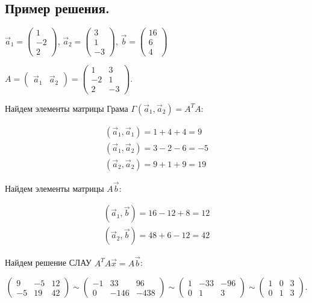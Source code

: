 \subsection{
    Пример решения.
}

$\vec{a}_1 = \begin{pmatrix} 1 \\ -2 \\ 2 \end{pmatrix}$, $\vec{a}_2 = \begin{pmatrix} 3 \\ 1 \\ -3 \end{pmatrix}$, $\vec{b} = \begin{pmatrix} 16 \\ 6 \\ 4 \end{pmatrix}$

$A = \begin{pmatrix} \vec{a}_1 & \vec{a}_2 \end{pmatrix} = \begin{pmatrix} 1 & 3 \\ -2 & 1 \\ 2 & -3 \end{pmatrix}.$

Найдем элементы матрицы Грама $\Gamma(\vec{a}_1, \vec{a}_2) = A^TA$:

\begin{gather*}
    (\vec{a}_1, \vec{a}_1) = 1 + 4 + 4 = 9 \\
    (\vec{a}_1, \vec{a}_2) = 3 - 2 - 6 = -5 \\
    (\vec{a}_2, \vec{a}_2) = 9 + 1 + 9 = 19
\end{gather*}


Найдем элементы матрицы $A\vec{b}$:

\begin{gather*}
    (\vec{a}_1, \vec{b}) = 16 - 12 + 8 = 12 \\
    (\vec{a}_2, \vec{b}) = 48 + 6 - 12 = 42
\end{gather*}

Найдем решение СЛАУ $A^TA\vec{x} = A\vec{b}$:

\begin{equation*}
    \left(\begin{array}{cc|c}
        9 & -5 & 12 \\
        -5 & 19 & 42
    \end{array}\right)
    \sim
    \left(\begin{array}{cc|c}
        -1 & 33 & 96 \\
        0 & -146 & -438
    \end{array}\right)
    \sim
    \left(\begin{array}{cc|c}
        1 & -33 & -96 \\
        0 & 1 & 3
    \end{array}\right)
    \sim
    \left(\begin{array}{cc|c}
        1 & 0 & 3 \\
        0 & 1 & 3
    \end{array}\right)
.\end{equation*}

